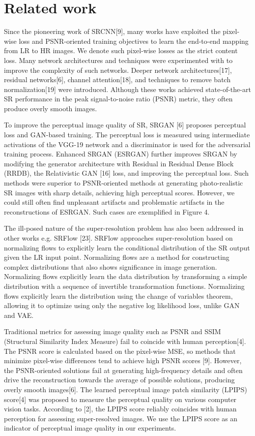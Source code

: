 \documentclass{article}
\begin{document}
\section{Related work}


\label{gen_inst}

Since the pioneering work of SRCNN[9], many works have exploited the pixel-wise loss and PSNR-oriented training objectives to learn the end-to-end mapping from LR to HR images. We denote such pixel-wise losses as the strict content loss. Many network architectures and techniques were experimented with to improve the complexity of such networks. Deeper network architectures[17], residual networks[6], channel attention[18], and techniques to remove batch normalization[19] were introduced. Although these works achieved state-of-the-art SR performance in the peak signal-to-noise ratio (PSNR) metric, they often produce overly smooth images.


To improve the perceptual image quality of SR, SRGAN [6] proposes perceptual loss and GAN-based training. The perceptual loss is measured using intermediate activations of the VGG-19 network and a discriminator is used for the adversarial training process. Enhanced SRGAN (ESRGAN) further improves SRGAN by modifying the generator architecture with Residual in Residual Dense Block (RRDB), the Relativistic GAN [16] loss, and improving the perceptual loss. Such methods were superior to PSNR-oriented methods at generating photo-realistic SR images with sharp details, achieving high perceptual scores. However, we could still often find unpleasant artifacts and problematic artifacts in the reconstructions of ESRGAN. Such cases are exemplified in Figure 4.

The ill-posed nature of the super-resolution problem has also been addressed in other works e.g. SRFlow [23]. SRFlow approaches super-resolution based on normalizing flows to explicitly learn the conditional distribution of the SR output given the LR input point. Normalizing flows are a method for constructing complex distributions that also shows significance in image generation. Normalizing flows explicitly learn the data distribution by transforming a simple distribution with a sequence of invertible transformation functions. Normalizing flows explicitly learn the distribution using the change of variables theorem, allowing it to optimize using only the negative log likelihood loss, unlike GAN and VAE.

Traditional metrics for assessing image quality such as PSNR and SSIM (Structural Similarity Index Measure) fail to coincide with human perception[4]. The PSNR score is calculated based on the pixel-wise MSE, so methods that minimize pixel-wise differences tend to achieve high PSNR scores [9]. However, the PSNR-oriented solutions fail at generating high-frequency details and often drive the reconstruction towards the average of possible solutions, producing overly smooth images[6]. The learned perceptual image patch similarity (LPIPS) score[4] was proposed to measure the perceptual quality on various computer vision tasks. According to [2], the LPIPS score reliably coincides with human perception for assessing super-resolved images. We use the LPIPS score as an indicator of perceptual image quality in our experiments.
\end{document}
